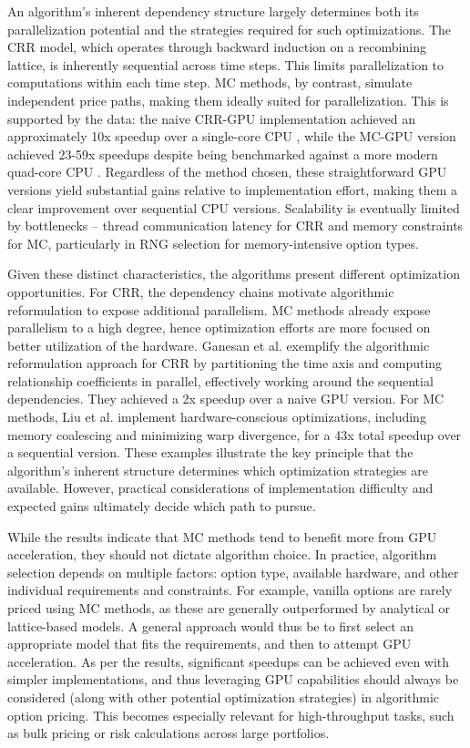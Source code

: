\documentclass[english,12pt,a4paper,pdftex,sci,utf8]{aaltothesis}
\begin{document}
An algorithm's inherent dependency structure largely determines both its parallelization potential and the strategies required for such optimizations. The CRR model, which operates through backward induction on a recombining lattice, is inherently sequential across time steps. This limits parallelization to computations within each time step. MC methods, by contrast, simulate independent price paths, making them ideally suited for parallelization. This is supported by the data: the naive CRR-GPU implementation achieved an approximately 10x speedup over a single-core CPU \cite{pharr2005gpu}, while the MC-GPU version achieved 23-59x speedups despite being benchmarked against a more modern quad-core CPU \cite{nguyen2007gpu}. Regardless of the method chosen, these straightforward GPU versions yield substantial gains relative to implementation effort, making them a clear improvement over sequential CPU versions. Scalability is eventually limited by bottlenecks -- thread communication latency for CRR and memory constraints for MC, particularly in RNG selection for memory-intensive option types.

Given these distinct characteristics, the algorithms present different optimization opportunities. For CRR, the dependency chains motivate algorithmic reformulation to expose additional parallelism. MC methods already expose parallelism to a high degree, hence optimization efforts are more focused on better utilization of the hardware. Ganesan et al. \cite{ganesan2009acceleration} exemplify the algorithmic reformulation approach for CRR by partitioning the time axis and computing relationship coefficients in parallel, effectively working around the sequential dependencies. They achieved a 2x speedup over a naive GPU version. For MC methods, Liu et al. \cite{liu2010efficient} implement hardware-conscious optimizations, including memory coalescing and minimizing warp divergence, for a 43x total speedup over a sequential version. These examples illustrate the key principle that the algorithm's inherent structure determines which optimization strategies are available. However, practical considerations of implementation difficulty and expected gains ultimately decide which path to pursue.

While the results indicate that MC methods tend to benefit more from GPU acceleration, they should not dictate algorithm choice. In practice, algorithm selection depends on multiple factors: option type, available hardware, and other individual requirements and constraints. For example, vanilla options are rarely priced using MC methods, as these are generally outperformed by analytical or lattice-based models. A general approach would thus be to first select an appropriate model that fits the requirements, and then to attempt GPU acceleration. As per the results, significant speedups can be achieved even with simpler implementations, and thus leveraging GPU capabilities should always be considered (along with other potential optimization strategies) in algorithmic option pricing. This becomes especially relevant for high-throughput tasks, such as bulk pricing or risk calculations across large portfolios.
\end{document}
